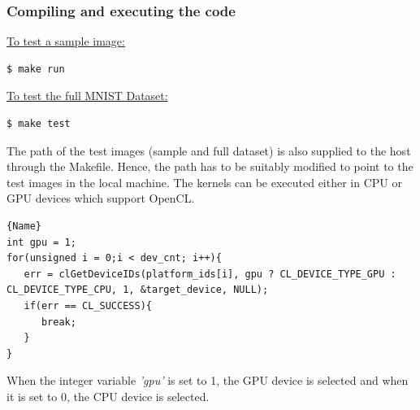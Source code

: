 \subsubsection{Compiling and executing the code}
\label{3_1_3_4}
\underline{To test a sample image:}\newline
\begin{scriptsize}
\linuxbash
\begin{lstlisting}
$ make run
\end{lstlisting}
\end{scriptsize}
\underline{To test the full MNIST Dataset:}\newline
\begin{scriptsize}
\linuxbash
\begin{lstlisting}
$ make test
\end{lstlisting}
\end{scriptsize}
The path of the test images (sample and full dataset) is also supplied to the host through the Makefile. Hence, the path has to be suitably modified to point to the test images in the local machine.\newline\newline
The kernels can be executed either in CPU or GPU devices which support OpenCL.\newline
\hfill
\begin{minipage}{\textwidth}
\begin{center}
\begin{lstlisting}[caption= CPU or GPU Device Selection,frame=tlrb]{Name}
int gpu = 1;
for(unsigned i = 0;i < dev_cnt; i++){
   err = clGetDeviceIDs(platform_ids[i], gpu ? CL_DEVICE_TYPE_GPU : CL_DEVICE_TYPE_CPU, 1, &target_device, NULL);
   if(err == CL_SUCCESS){
      break;
   }
}
\end{lstlisting}
\end{center}
\end{minipage}
When the integer variable \textit{'gpu'} is set to 1, the GPU device is selected and when it is set to 0, the CPU device is selected.
